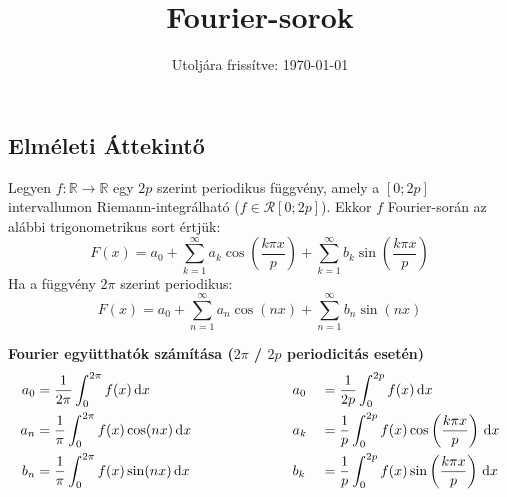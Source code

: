 \documentclass[a4paper, 12pt]{scrartcl}
\title{Fourier-sorok}
\date{Utoljára frissítve: \today}
\begin{document}
\maketitle
\subsection{Elméleti Áttekintő}
\begin{definition}
  Legyen $f : \mathbb R \rightarrow \mathbb R$ egy $2p$ szerint periodikus
  függvény, amely a $[0;2p]$ intervallumon Riemann-integrálható ($f \in
    \mathcal R [0; 2p]$). Ekkor $f$ Fourier-során az alábbi trigonometrikus
  sort értjük:
  \[
    F(x)
    = a_0
    + \sum_{k = 1}^\infty a_k \cos \left( \frac{k \pi x}{p} \right)
    + \sum_{k = 1}^\infty b_k \sin \left( \frac{k \pi x}{p} \right)
  \]
  Ha a függvény $2 \pi$ szerint periodikus:
  \[
    F(x)
    = a_0
    + \sum_{n = 1}^\infty a_n \cos (nx)
    + \sum_{n = 1}^\infty b_n \sin (nx)
  \]
\end{definition}

\begin{blueBox}
  \textbf{Fourier együtthatók számítása ($2\pi$ / $2p$ periodicitás esetén)}
  \begin{alignat*}{9}
      a_0 & =
      \frac{1}{2\pi} \int_0^{2\pi} f(x) \, \mathrm d x
          &   & a_0
          &   & =
      \frac{1}{2p} \int_0^{2p} f(x) \, \mathrm d x
      \\
      a_n & =
      \frac{1}{\pi} \int_0^{2\pi} f(x) \cos(n x) \, \mathrm d x
      \hspace{2.2cm}
          &   & a_k
          &   & =
      \frac{1}{p} \int_0^{2p} f(x) \cos \left( \frac{k \pi x}{p} \right) \, \mathrm d x
      \\
      b_n & =
      \frac{1}{\pi} \int_0^{2\pi} f(x) \sin(n x) \, \mathrm d x
          &   & b_k
          &   & =
      \frac{1}{p} \int_0^{2p} f(x) \sin \left( \frac{k \pi x}{p} \right) \, \mathrm d x
    \end{alignat*}
\end{blueBox}
\end{document}
